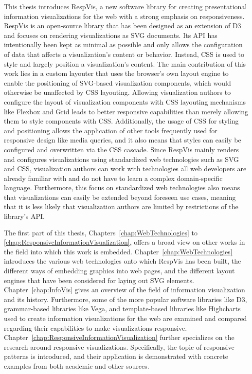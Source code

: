 This thesis introduces RespVis, a new software library for creating presentational information visualizations for the web with a strong emphasis on responsiveness.
RespVis is an open-source library \parencite{RespVisGitHub} that has been designed as an extension of D3 and focuses on rendering visualizations as SVG documents.
Its API has intentionally been kept as minimal as possible and only allows the configuration of data that affects a visualization's content or behavior.
Instead, CSS is used to style and largely position a visualization's content.
The main contribution of this work lies in a custom layouter that uses the browser's own layout engine to enable the positioning of SVG-based visualization components, which would otherwise be unaffected by CSS layouting.
Allowing visualization authors to configure the layout of visualization components with CSS layouting mechanisms like Flexbox and Grid leads to better responsive capabilities than merely allowing them to style components with CSS.
Additionally, the usage of CSS for styling and positioning allows the application of other tools frequently used for responsive design like media queries, and it also means that styles can easily be configured and overwritten via the CSS cascade.
Since RespVis mainly renders and configures visualizations using standardized web technologies such as SVG and CSS, visualization authors can work with technologies all web developers are already familiar with and do not have to learn a complex domain-specific language.
Furthermore, this focus on standardized web technologies also means that visualizations can easily be extended beyond foreseen use cases, meaning that it is less likely that visualization authors are limited by restrictions of the library's API. 

The first part of this thesis, Chapters~\ref{chap:WebTechnologies} to \ref{chap:ResponsiveInformationVisualization}, offers a broad view on other works in the field into which this work is embedded. Chapter~\ref{chap:WebTechnologies} introduces the various web technologies onto which RespVis has been built, the different ways of embedding graphics into web pages, and the different layout engines that have been considered for laying out SVG elements.
Chapter~\ref{chap:InfoVis} gives an overview of the field of information visualization and its history.
Furthermore, some of the more popular software libraries like D3, grammar-based libraries like Vega, and template-based libraries like Highcharts used to create information visualizations for the web are examined and compared regarding their capabilities to make visualizations responsive.
Chapter~\ref{chap:ResponsiveInformationVisualization} further specializes on the research around responsive visualizations.
Specifically, the topic of responsive patterns is introduced, and their application is demonstrated with concrete examples from both academic and other sources. 

